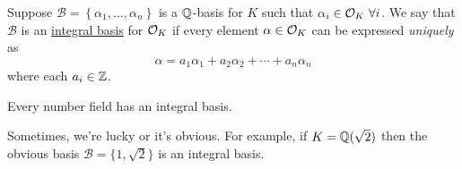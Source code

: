 \begin{definition}
    Suppose $\mathcal{B} = \left\{ \alpha_1, \dots, \alpha_n \right\}$ is a $\mathbb Q$-basis for $K$ such that $\alpha_i\in \mathcal{O}_K\ \forall i$. We say that $\mathcal{B}$ is an \ul{integral basis} for $\mathcal{O}_K$ if every element $\alpha\in\mathcal{O}_K$ can be expressed \emph{uniquely} as
    \[\alpha = a_1\alpha_1 + a_2\alpha_2 + \cdots + a_n\alpha_n\]
    where each $a_i\in\mathbb Z$.
\end{definition}
\begin{theorem}
    Every number field has an integral basis.
\end{theorem}
\begin{example}
    Sometimes, we're lucky or it's obvious. For example, if $K = \mathbb Q(\sqrt{2})$ then the obvious basis $\mathcal{B} = \{1, \sqrt{2}\}$ is an integral basis.
\end{example}
